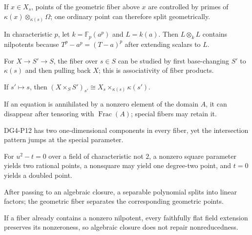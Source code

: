 \begin{example}\label{ex:vi25-a01}
If $x\in X_s$, points of the geometric fiber above $x$ are controlled by primes of $\kappa(x)\otimes_{\kappa(s)}\Omega$; one ordinary point can therefore split geometrically.
\end{example}
\begin{example}\label{ex:vi25-a02}
In characteristic $p$, let $k=\mathbb F_p(a^p)$ and $L=k(a)$. Then $L\otimes_kL$ contains nilpotents because $T^p-a^p=(T-a)^p$ after extending scalars to $L$.
\end{example}
\begin{example}\label{ex:vi25-a03}
For $X\to S'\to S$, the fiber over $s\in S$ can be studied by first base-changing $S'$ to $\kappa(s)$ and then pulling back $X$; this is associativity of fiber products.
\end{example}
\begin{example}\label{ex:vi25-a04}
If $s'\mapsto s$, then $(X\times_SS')_{s'}\cong X_s\times_{\kappa(s)}\kappa(s')$.
\end{example}
\begin{example}\label{ex:vi25-a05}
If an equation is annihilated by a nonzero element of the domain $A$, it can disappear after tensoring with $\operatorname{Frac}(A)$; special fibers may retain it.
\end{example}
\begin{example}\label{ex:vi25-a06}
DG4-P12 has two one-dimensional components in every fiber, yet the intersection pattern jumps at the special parameter.
\end{example}
\begin{example}\label{ex:vi25-a07}
For $u^2-t=0$ over a field of characteristic not $2$, a nonzero square parameter yields two rational points, a nonsquare may yield one degree-two point, and $t=0$ yields a doubled point.
\end{example}
\begin{example}\label{ex:vi25-a08}
After passing to an algebraic closure, a separable polynomial splits into linear factors; the geometric fiber separates the corresponding geometric points.
\end{example}
\begin{example}\label{ex:vi25-a09}
If a fiber already contains a nonzero nilpotent, every faithfully flat field extension preserves its nonzeroness, so algebraic closure does not repair nonreducedness.
\end{example}
